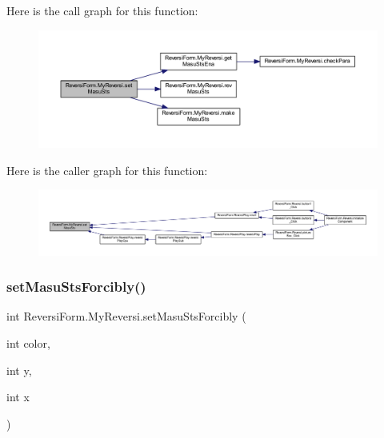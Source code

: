 Here is the call graph for this function\+:\nopagebreak
\begin{figure}[H]
\begin{center}
\leavevmode
\includegraphics[width=350pt]{class_reversi_form_1_1_my_reversi_a1f7ba86f6e8d5dd2fa472a8994e4e3c5_cgraph}
\end{center}
\end{figure}
Here is the caller graph for this function\+:\nopagebreak
\begin{figure}[H]
\begin{center}
\leavevmode
\includegraphics[width=350pt]{class_reversi_form_1_1_my_reversi_a1f7ba86f6e8d5dd2fa472a8994e4e3c5_icgraph}
\end{center}
\end{figure}
\mbox{\label{class_reversi_form_1_1_my_reversi_a940c5ec6841ffa050a53276815afcc9d}} 
\subsubsection{\texorpdfstring{set\+Masu\+Sts\+Forcibly()}{setMasuStsForcibly()}}
{\footnotesize\ttfamily int Reversi\+Form.\+My\+Reversi.\+set\+Masu\+Sts\+Forcibly (\begin{DoxyParamCaption}\item[{int}]{color,  }\item[{int}]{y,  }\item[{int}]{x }\end{DoxyParamCaption})}



